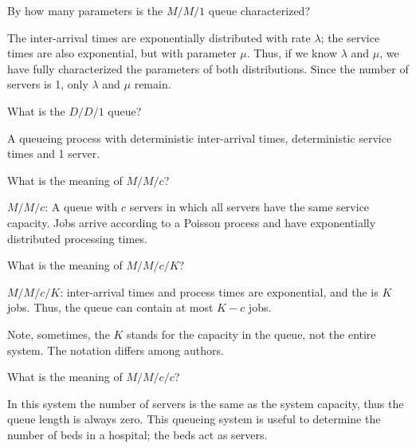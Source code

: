 \begin{exercise}
  By how many parameters is the $M/M/1$ queue characterized?
  \begin{solution}
    The inter-arrival times are exponentially distributed with rate $\lambda$; the service times are also exponential, but with parameter $\mu$. Thus, if we know $\lambda$ and $\mu$, we have fully characterized the parameters of both distributions. Since the number of servers is 1, only $\lambda$ and $\mu$ remain.
  \end{solution}
\end{exercise}

\begin{exercise}
What is the $D/D/1$ queue?  
\begin{solution}
  A queueing process with deterministic inter-arrival times, deterministic service times and 1 server.
\end{solution}
\end{exercise}

\begin{exercise}
  What is the meaning of $M/M/c$?
  \begin{solution}
$M/M/c$: A  queue with $c$ servers in which
  all servers have the same service capacity. Jobs arrive according to a
  Poisson process and have exponentially distributed processing times.
  \end{solution}
\end{exercise}

\begin{exercise}
  What is the meaning of $M/M/c/K$?
  \begin{solution}
\item $M/M/c/K$: inter-arrival times and process times are exponential,
  and the  is $K$ jobs. Thus, the queue can
  contain at most $K-c$ jobs. 

Note, sometimes, the $K$ stands for
    the capacity in the queue, not the entire system. The notation differs among
    authors.
  \end{solution}
\end{exercise}


\begin{exercise}
  What is the meaning of $M/M/c/c$?
  \begin{solution}
 In this system the number of servers is the same as
  the system capacity, thus the queue length is always zero. This
  queueing system is useful to determine the number of beds
  in a hospital; the beds act as servers.
  \end{solution}
\end{exercise}

